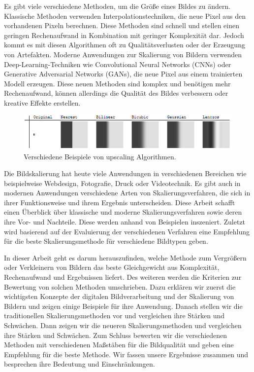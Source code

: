 Es gibt viele verschiedene Methoden, um die Größe eines Bildes zu ändern. 
Klassische Methoden verwenden Interpolationstechniken, die neue Pixel aus den vorhandenen Pixeln berechnen. 
Diese Methoden sind schnell und stellen einen geringen Rechenaufwand in Kombination mit geringer Komplexität dar. 
Jedoch kommt es mit diesen Algorithmen oft zu Qualitätsverlusten oder der Erzeugung von Artefakten. 
Moderne Anwendungen zur Skalierung von Bildern verwenden Deep-Learning-Techniken wie Convolutional Neural Networks (CNNs) oder Generative Adversarial Networks (GANs), die neue Pixel aus einem trainierten Modell erzeugen. 
Diese neuen Methoden sind komplex und benötigen mehr Rechenaufwand, können allerdings die Qualität des Bildes verbessern oder kreative Effekte erstellen.

\begin{figure}[h!]
    \vspace{8mm}
    \centering
    \includegraphics{img/xaR8r.png}
    \caption{Verschiedene Beispiele von upscaling Algorithmen\cite{whuber.lanczos}.}
    \label{fig:my_label}
    \vspace{4mm}
\end{figure}

Die Bildskalierung hat heute viele Anwendungen in verschiedenen Bereichen wie beispielweise Webdesign, Fotografie, Druck oder Videotechnik. 
Es gibt auch in modernen Anwendungen verschiedene Arten von Skalierungsverfahren, die sich in ihrer Funktionsweise und ihrem Ergebnis unterscheiden. 
Diese Arbeit schafft einen Überblick über klassische und moderne Skalierungsverfahren sowie deren ihre Vor- und Nachteile. 
Diese werden anhand von Beispielen inszeniert. 
Zuletzt wird basierend auf der Evaluierung der verschiedenen Verfahren eine Empfehlung für die beste Skalierungsmethode für verschiedene Bildtypen geben. 

In dieser Arbeit geht es darum herauszufinden, welche Methode zum Vergrößern oder Verkleinern von Bildern das beste Gleichgewicht aus Komplexität, Rechenaufwand und Ergebnissen liefert. 
Des weiteren werden die Kriterien zur Bewertung von solchen Methoden umschrieben. 
Dazu erklären wir zuerst die wichtigsten Konzepte der digitalen Bildverarbeitung und der Skalierung von Bildern und zeigen einige Beispiele für ihre Anwendung. Danach stellen wir die traditionellen Skalierungsmethoden vor und vergleichen ihre Stärken und Schwächen. Dann zeigen wir die neueren Skalierungsmethoden und vergleichen ihre Stärken und Schwächen. Zum Schluss bewerten wir die verschiedenen Methoden mit verschiedenen Maßstäben für die Bildqualität und geben eine Empfehlung für die beste Methode. Wir fassen unsere Ergebnisse zusammen und besprechen ihre Bedeutung und Einschränkungen.
